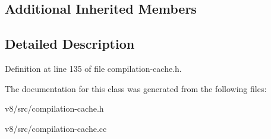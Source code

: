 \subsection*{Additional Inherited Members}


\subsection{Detailed Description}


Definition at line 135 of file compilation-\/cache.\+h.



The documentation for this class was generated from the following files\+:\begin{DoxyCompactItemize}
\item 
v8/src/compilation-\/cache.\+h\item 
v8/src/compilation-\/cache.\+cc\end{DoxyCompactItemize}
